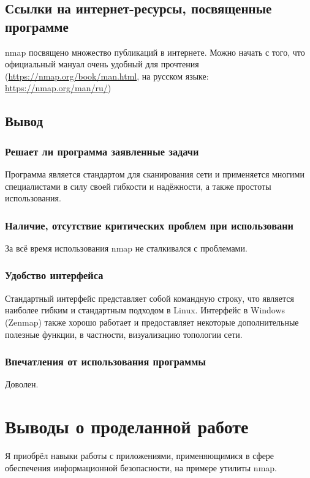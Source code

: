 \subsection{Ссылки на интернет-ресурсы, посвященные программе}
nmap посвящено множество публикаций в интернете. Можно начать с того, что официальный мануал очень удобный для прочтения (\url{https://nmap.org/book/man.html}, на русском языке: \url{https://nmap.org/man/ru/})
\clearpage

\subsection{Вывод}

\subsubsection{Решает ли программа заявленные задачи}
Программа является стандартом для сканирования сети и применяется многими специалистами в силу своей гибкости и надёжности, а также простоты использования.

\subsubsection{Наличие, отсутствие критических проблем при использовани}
За всё время использования nmap не сталкивался с проблемами.

\subsubsection{Удобство интерфейса}
Стандартный интерфейс представляет собой командную строку, что является наиболее гибким  и стандартным подходом в Linux. Интерфейс в Windows (Zenmap) также хорошо работает и предоставляет некоторые дополнительные полезные функции, в частности, визуализацию топологии сети.

\subsubsection{Впечатления от использования программы}
Доволен.


\clearpage

\section{Выводы о проделанной работе}
Я приобрёл навыки работы с приложениями, применяющимися в сфере обеспечения информационной безопасности, на примере утилиты nmap.

\clearpage